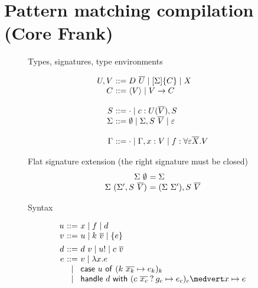 \documentclass[preprint]{sigplanconf}
\newcommand{\many}{\overline}
\newcommand{\rt}[1]{\langle{#1}\rangle}   %
\newcommand{\sig}{S}
\newcommand{\sigs}{\Sigma}
\newcommand{\effbox}[1]{[#1]}
\newcommand{\key}[1]{\mathsf{#1}}
\newcommand{\handleSymbol}{\mathbin{?}}
\newcommand{\handle}[2]{{#1} \handleSymbol {#2}}
\newcommand{\thunk}[1]{\{{#1}\}}
\newcommand{\force}[1]{{#1}!}
\begin{document}





\section{Pattern matching compilation (Core Frank)}

\begin{figure*}
Types, signatures, type environments

\[
\begin{array}{@{}r@{~}l@{}}
U, V &::= D~\many{U} \mid  \effbox{\sigs}\thunk{C} \mid X \\
C    &::= \rt{V} \mid V \to C \\
\\
\sig  &::= \cdot \mid c : U(\many{V}), \sig \\
\sigs &::=
  \emptyset \mid \sigs, \sig~\many{V} \mid \varepsilon \\
\\
\Gamma &::= \cdot \mid \Gamma, x:V \mid f:\forall \varepsilon \many{X}.V \\
\end{array}
\]

Flat signature extension (the right signature must be closed)
\[
\begin{array}{@{}r@{~}l@{}}
\sigs~\emptyset &= \sigs \\
\sigs~(\sigs', \sig~\many{V}) &= (\sigs~\sigs'), \sig~\many{V} \\
\end{array}
\]

Syntax

\[
\begin{array}{@{}r@{~}c@{~}l@{}}
u &::=& x \mid f \mid d                           \\ %
v &::=& u \mid k~\many{v}                            %
          \mid \thunk{e}  \\[1ex]
d &::=& d~v \mid \force{u} \mid c~\many{v} \\        %
e &::=& v \mid \lambda x.e \\                        %
  &\mid& \key{case}~u~\key{of}~
           (k~\many{x_k} \mapsto e_k)_k \\
  &\mid& \key{handle} ~d~ \key{with}~
           (\handle{c~\many{x_c}}{g_c} \mapsto e_c)_c \medvert
            x        \mapsto e \\
\end{array}
\]


\end{figure*}
\end{document}

